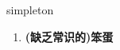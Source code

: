 
\begin{frame}
{\huge simpleton}
\begin{center}
\begin{enumerate}\Large
  \item \textbf{(缺乏常识的)笨蛋}
\end{enumerate}
\end{center}
\end{frame}
